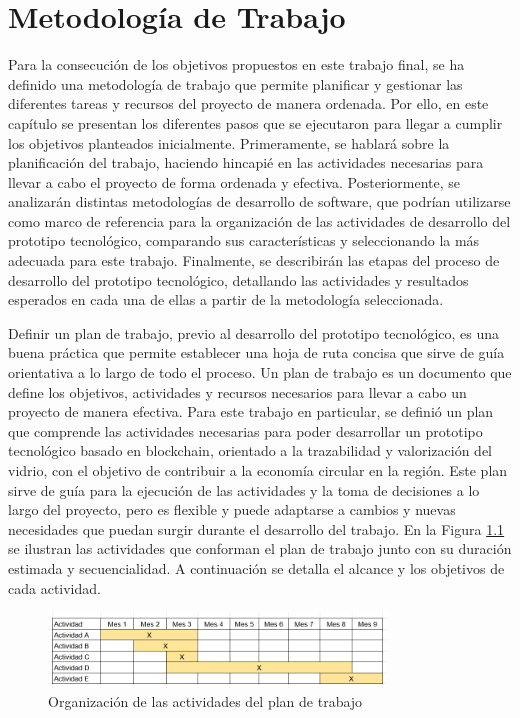 \chapter[Metodología de Trabajo]{Metodología de Trabajo}
\label{cp:methodology}

\parindent0pt

Para la consecución de los objetivos propuestos en este trabajo final, se ha definido una metodología de trabajo que permite planificar y gestionar las diferentes tareas y recursos del proyecto de manera ordenada. Por ello, en este capítulo se presentan los diferentes pasos que se ejecutaron para llegar a cumplir los objetivos planteados inicialmente. Primeramente, se hablará sobre la planificación del trabajo, haciendo hincapié en las actividades necesarias para llevar a cabo el proyecto de forma ordenada y efectiva. Posteriormente, se analizarán distintas metodologías de desarrollo de software, que podrían utilizarse como marco de referencia para la organización de las actividades de desarrollo del prototipo tecnológico, comparando sus características y seleccionando la más adecuada para este trabajo. Finalmente, se describirán las etapas del proceso de desarrollo del prototipo tecnológico, detallando las actividades y resultados esperados en cada una de ellas a partir de la metodología seleccionada.

Definir un plan de trabajo, previo al desarrollo del prototipo tecnológico, es una buena práctica que permite establecer una hoja de ruta concisa que sirve de guía orientativa a lo largo de todo el proceso. Un plan de trabajo es un documento que define los objetivos, actividades y recursos necesarios para llevar a cabo un proyecto de manera efectiva. Para este trabajo en particular, se definió un plan que comprende las actividades necesarias para poder desarrollar un prototipo tecnológico basado en blockchain, orientado a la trazabilidad y valorización del vidrio, con el objetivo de contribuir a la economía circular en la región. Este plan sirve de guía para la ejecución de las actividades y la toma de decisiones a lo largo del proyecto, pero es flexible y puede adaptarse a cambios y nuevas necesidades que puedan surgir durante el desarrollo del trabajo. En la Figura \ref{fig:activities-plan} se ilustran las actividades que conforman el plan de trabajo junto con su duración estimada y secuencialidad. A continuación se detalla el alcance y los objetivos de cada actividad.

\begin{figure}[!htb]
    \centering
    \includegraphics[width=0.8\textwidth]{Figures/activities-plan.png}
    \caption{Organización de las actividades del plan de trabajo}
    \label{fig:activities-plan}
\end{figure}

